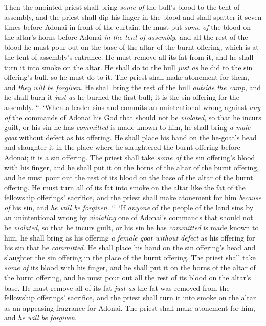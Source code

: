 \begin{biblechapter}
\verse Then the anointed priest shall bring \textit{some of} the bull’s blood to the tent of assembly,
\verse and the priest shall dip his finger in the blood and shall spatter it seven times before Adonai in front of the curtain.
\verse He must put \textit{some of} the blood on the altar’s horns before Adonai \textit{in the tent of assembly}, and all the rest of the blood he must pour out on the base of the altar of the burnt offering, which is at the tent of assembly’s entrance.
\verse He must remove all its fat from it, and he shall turn it into smoke on the altar.
\verse He shall do to the bull \textit{just as} he did to the sin offering’s bull, so he must do to it. The priest shall make atonement for them, and \textit{they will be forgiven}.
\verse He shall bring the rest of the bull \textit{outside the camp}, and he shall burn it \textit{just as} he burned the first bull; it is the sin offering for the assembly.
\verse “ ‘When a leader sins and commits an unintentional wrong against \textit{any of} the commands of Adonai his God that should not be \textit{violated}, so that he incurs guilt,
\verse or his sin he has \textit{committed} is made known to him, he shall bring \textit{a male goat} without defect as his offering.
\verse He shall place his hand on the he-goat’s head and slaughter it in the place where he slaughtered the burnt offering before Adonai; it is a sin offering.
\verse The priest shall take \textit{some of} the sin offering’s blood with his finger, and he shall put it on the horns of the altar of the burnt offering, and he must pour out the rest of its blood on the base of the altar of the burnt offering.
\verse He must turn all of its fat into smoke on the altar like the fat of the fellowship offerings’ sacrifice, and the priest shall make atonement for him \textit{because of} his sin, and \textit{he will be forgiven}.
\verse “ ‘If \textit{anyone} of the people of the land sins by an unintentional wrong by \textit{violating} one of Adonai’s commands that should not be \textit{violated}, so that he incurs guilt,
\verse or his sin he has \textit{committed} is made known to him, he shall bring as his offering \textit{a female goat without defect} as his offering for his sin that he \textit{committed}.
\verse He shall place his hand on the sin offering’s head and slaughter the sin offering in the place of the burnt offering.
\verse The priest shall take \textit{some of} its blood with his finger, and he shall put it on the horns of the altar of the burnt offering, and he must pour out all the rest of its blood on the altar’s base.
\verse He must remove all of its fat \textit{just as} the fat was removed from the fellowship offerings’ sacrifice, and the priest shall turn it into smoke on the altar as an appeasing fragrance for Adonai. The priest shall make atonement for him, and \textit{he will be forgiven}.

\end{biblechapter}
